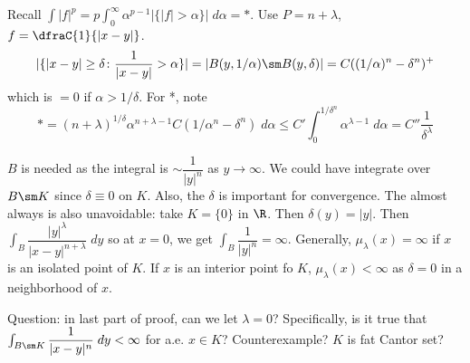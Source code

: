Recall $\int |f|^p= p \int_0^\infty \alpha^{p-1} |\{|f|>\alpha\}| \; d \alpha= *$. Use $P= n + \lambda$, $f=\dfraC{1}{|x-y|}$.
	\[
	| \{ |x-y| \geq \delta \colon \dfrac{1}{|x-y|}>\alpha\}| = |B(y,1/\alpha) \sm B(y,\delta)|= C((1/\alpha)^n - \delta^n)^+
	\]
which is $=0$ if $\alpha>1/\delta$. For *, note
	\[
	*= (n+\lambda)^{1/\delta} \alpha^{n+\lambda-1} C (1/\alpha^n - \delta^n) \; d\alpha \leq C' \int_0^{1/\delta^n} \alpha^{\lambda-1} \; d \alpha = C'' \dfrac{1}{\delta^\lambda}
	\]





$B$ is needed as the integral is $\sim \dfrac{1}{|y|^n}$ as $y \to \infty$. We could have integrate over $B \sm K$ since $\delta \equiv 0$ on $K$. Also, the $\delta$ is important for convergence. The almost always is also unavoidable: take $K=\{0\}$ in $\R$. Then $\delta(y)= |y|$. Then $\int_B \dfrac{|y|^\lambda}{|x-y|^{n+\lambda}} \; dy$ so at $x=0$, we get $\int_B \dfrac{1}{|y|^n}= \infty$. Generally, $\mu_\lambda(x)= \infty$ if $x$ is an isolated point of $K$. If $x$ is an interior point fo $K$, $\mu_\lambda(x)< \infty$ as $\delta=0$ in a neighborhood of $x$.




Question: in last part of proof, can we let $\lambda=0$? Specifically, is it true that $\int_{B \sm K} \dfrac{1}{|x-y|^n} \; dy< \infty$ for a.e. $x \in K$? Counterexample? $K$ is fat Cantor set?






















